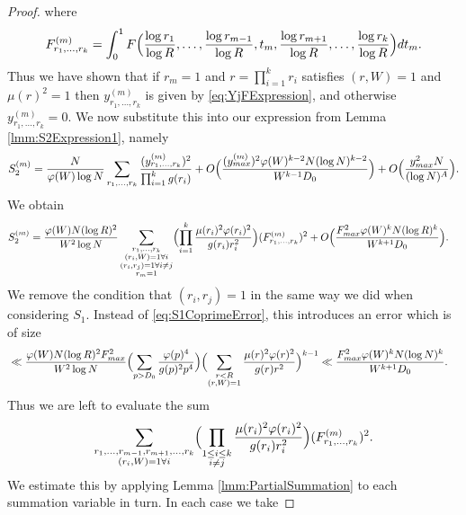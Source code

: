 \documentclass[12pt,a4paper]{amsart}
\theoremstyle{plain}
\numberwithin{sblmm}{thrm}
\numberwithin{equation}{section}
\renewcommand{\phi}{\varphi}
\begin{document}
\begin{proof}
where
\begin{equation}
F^{(m)}_{r_1,\dotsc,r_k}=\int_0^1F\Bigl(\frac{\log{r_1}}{\log{R}},\dotsc,\frac{\log{r_{m-1}}}{\log{R}},t_m,\frac{\log{r_{m+1}}}{\log{R}},\dotsc,\frac{\log{r_k}}{\log{R}}\Bigr)dt_m.
\end{equation}
Thus we have shown that if $r_m=1$ and $r=\prod_{i=1}^kr_i$ satisfies $(r,W)=1$ and $\mu(r)^2=1$ then $y^{(m)}_{r_1,\dotsc,r_k}$ is given by \eqref{eq:YjFExpression}, and otherwise $y^{(m)}_{r_1,\dotsc,r_k}=0$. We now substitute this into our expression from Lemma \ref{lmm:S2Expression1}, namely
\begin{equation}
S_2^{(m)}=\frac{N}{\phi(W)\log{N}}\sum_{r_1,\dotsc,r_k}\frac{(y^{(m)}_{r_1,\dotsc,r_k})^2}{\prod_{i=1}^kg(r_i)}+O\Bigl(\frac{(y^{(m)}_{max})^2 \phi(W)^{k-2} N (\log{N})^{k-2}}{W^{k-1} D_0}\Bigr)+O\Bigl(\frac{y_{max}^2 N}{(\log{N})^A}\Bigr).\end{equation}
 We obtain
\begin{align}
S_2^{(m)}&=\frac{\phi(W) N (\log{R})^2}{W^2\log{N}}\sum_{\substack{r_1,\dotsc,r_k\\(r_i,W)=1\forall i\\(r_{i},r_{j})=1 \forall i\ne j\\ r_m=1}}\Bigl(\prod_{i=1}^k\frac{\mu(r_i)^2\phi(r_i)^2}{g(r_i)r_i^2}\Bigr)(F^{(m)}_{r_1,\dotsc,r_k})^2+O\Bigl(\frac{F_{max}^2 \phi(W)^{k} N (\log{R})^k}{W^{k+1} D_0}\Bigl).
\end{align}
We remove the condition that $(r_{i},r_{j})=1$ in the same way we did when considering $S_1$. Instead of \eqref{eq:S1CoprimeError}, this introduces an error which is of size
\begin{align}
&\ll \frac{\phi(W) N (\log{R})^2F_{max}^2}{W^2\log{N}}\Bigl(\sum_{p>D_0}\frac{\phi(p)^4}{g(p)^2p^4}\Bigr)\Bigl(\sum_{\substack{r<R\\ (r,W)=1}}\frac{\mu(r)^2\phi(r)^2}{g(r)r^2}\Bigr)^{k-1}\ll \frac{F_{max}^2 \phi(W)^k N (\log{N})^k}{W^{k+1} D_0}.
\end{align}
Thus we are left to evaluate the sum
\begin{equation}
\sum_{\substack{r_1,\dotsc,r_{m-1},r_{m+1},\dotsc,r_k\\(r_i,W)=1\forall i }}\Bigl(\prod_{\substack{1\le i \le k\\i\ne j}}\frac{\mu(r_i)^2\phi(r_i)^2}{g(r_i)r_i^2}\Bigr)(F^{(m)}_{r_1,\dotsc,r_k})^2.
\end{equation}
We estimate this by applying Lemma \ref{lmm:PartialSummation} to each summation variable in turn. In each case we take

\end{proof}
\end{document}
